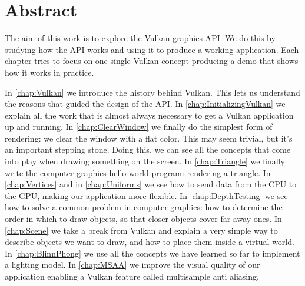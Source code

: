 \chapter*{Abstract}

The aim of this work is to explore the Vulkan graphics API.
We do this by studying how the API works and using it to produce a working
application.
Each chapter tries to focus on one single Vulkan concept producing a demo
that shows how it works in practice.

In \autoref{chap:Vulkan} we introduce the history behind Vulkan.
This lets us understand the reasons that guided the design of the API.
In \autoref{chap:InitializingVulkan} we explain all the work that is almost
always necessary to get a Vulkan application up and running.
In \autoref{chap:ClearWindow} we finally do the simplest form of rendering:
we clear the window with a flat color.
This may seem trivial, but it's an important stepping stone.
Doing this, we can see all the concepts that come into play when drawing something
on the screen.
In \autoref{chap:Triangle} we finally write the computer graphics hello world
program: rendering a triangle.
In \autoref{chap:Vertices} and in \autoref{chap:Uniforms} we see how to send
data from the CPU to the GPU, making our application more flexible.
In \autoref{chap:DepthTesting} we see how to solve a common problem in computer
graphics: how to determine the order in which to draw objects, so that closer
objects cover far away ones.
In \autoref{chap:Scene} we take a break from Vulkan and
explain a very simple way to describe objects we want to draw, and how
to place them inside a virtual world.
In \autoref{chap:BlinnPhong} we use all the concepts we have learned so far
to implement a lighting model.
In \autoref{chap:MSAA} we improve the visual quality of our application
enabling a Vulkan feature called multisample anti aliasing.
